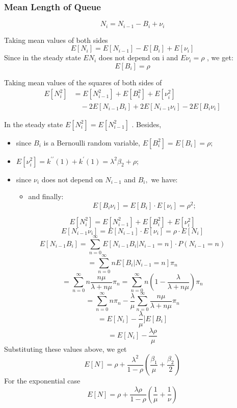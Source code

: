 \documentclass[10pt]{article}
\begin{document}
\subsubsection{Mean Length of Queue}
$$N_i=N_{i-1}-B_i+\nu_i$$

Taking mean values of both sides
\[E[N_{i}]=E[N_{i-1}]-E[B_{i}]+E[\nu_{i}]\]
Since in the steady state \(EN_{i}\) does not depend on i and \(E\nu_{i}=\rho\) ,
we get:
\[E[B_{i}]=\rho\]

Taking mean values of the squares of both sides of 
\begin{align*}
    E[N_{i}^2] &= E[N_{i-1}^2] + E[B_i^2] + E[\nu_i^2] \\
               &\quad - 2E[N_{i-1}B_{i}] + 2E[N_{i-1}\nu_{i}] - 2E[B_{i}\nu_{i}]
\end{align*}

In the steady state \(E[N_{i}^{2}]=E[N_{i-1}^{2}]\) . Besides,

\begin{itemize}
\item since \(B_{i}\) is a Bernoulli random variable, \(E[B_{i}^{2}]=E[B_{i}]=\rho;\)
\item \(E[\nu_{i}^{2}]=k^{\prime\prime}(1)+k^{\prime}(1)=\lambda^{2}\beta_{2}+\rho;\)
\item since \(\nu_{i}\) does not depend on \(N_{i-1}\) and \(B_{i},\) we have:
\begin{itemize}
\item and finally:
\[E[B_{i}\nu_{i}]=E[B_{i}]\cdot E[\nu_{i}]=\rho^{2};\]
\end{itemize}
\end{itemize}

\[E[N_{i}^{2}]=E[N_{i-1}^{2}]+E[B_{i}^{2}]+E[\nu_{i}^{2}]\]
\[E[N_{i-1}\nu_{i}]=E[N_{i-1}]\cdot E[\nu_{i}]=\rho\cdot E[N_{i}]\]
\[E[N_{i-1}B_{i}]=\sum_{n=0}^{\infty}E[N_{i-1}B_{i}|N_{i-1}=n]\cdot P(N_{i-1}=n)\]
\[=\sum_{n=0}^{\infty}nE[B_{i}|N_{i-1}=n]\pi_{n}\]
\[=\sum_{n=0}^{\infty}n\frac{n\mu}{\lambda+n\mu}\pi_{n}=\sum_{n=0}^{\infty}n(1-\frac{\lambda}{\lambda+n\mu})\pi_{n}\]
\[=\sum_{n=0}^{\infty}n\pi_{n}-\frac{\lambda}{\mu}\sum_{n=0}^{\infty}\frac{n\mu}{\lambda+n\mu}\pi_{n}\]
\[=E[N_i]-\frac{\lambda}{\mu}]E[B_i]\]
\[=E[N_i]-\frac{\lambda\rho}{\mu}\]
Substituting these values above, we get
\[
E[N]=\rho+\frac{\lambda^2}{1-\rho}\left( \frac{\beta_1}{\mu}+\frac{\beta_2}{2}\right)
\]
For the exponential case
\[
E[N]=\rho+\frac{\lambda \rho}{1-\rho}\left( \frac{1}{\mu}+\frac{1}{\nu}\right)
\]
\end{document}

